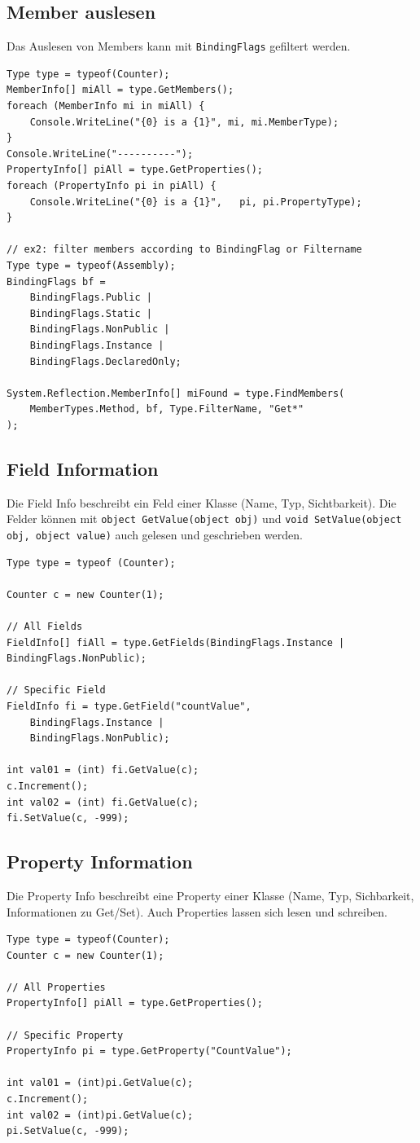 \subsection{Member auslesen}
Das Auslesen von Members kann mit \lstinline|BindingFlags| gefiltert werden.
\begin{lstlisting}[caption=Reflection: Members auslesen]
Type type = typeof(Counter);
MemberInfo[] miAll = type.GetMembers();
foreach (MemberInfo mi in miAll) {
	Console.WriteLine("{0} is a {1}", mi, mi.MemberType);
}
Console.WriteLine("----------");
PropertyInfo[] piAll = type.GetProperties();
foreach (PropertyInfo pi in piAll) {
	Console.WriteLine("{0} is a {1}",	pi, pi.PropertyType);
}

// ex2: filter members according to BindingFlag or Filtername
Type type = typeof(Assembly);
BindingFlags bf =
	BindingFlags.Public |
	BindingFlags.Static |
	BindingFlags.NonPublic |
	BindingFlags.Instance |
	BindingFlags.DeclaredOnly;

System.Reflection.MemberInfo[] miFound = type.FindMembers(
	MemberTypes.Method, bf, Type.FilterName, "Get*"
);
\end{lstlisting}

\subsection{Field Information}
Die Field Info beschreibt ein Feld einer Klasse (Name, Typ, Sichtbarkeit). Die Felder können mit \lstinline|object GetValue(object obj)| und \lstinline|void SetValue(object obj, object value)| auch gelesen und geschrieben werden.

\begin{lstlisting}[caption=Reflection: Field Info]
Type type = typeof (Counter);

Counter c = new Counter(1);

// All Fields
FieldInfo[] fiAll = type.GetFields(BindingFlags.Instance | BindingFlags.NonPublic);
	
// Specific Field
FieldInfo fi = type.GetField("countValue", 
	BindingFlags.Instance | 
	BindingFlags.NonPublic);
	
int val01 = (int) fi.GetValue(c);
c.Increment();
int val02 = (int) fi.GetValue(c);
fi.SetValue(c, -999);
\end{lstlisting}

\subsection{Property Information}
Die Property Info beschreibt eine Property einer Klasse (Name, Typ, Sichbarkeit, Informationen zu Get/Set). Auch Properties lassen sich lesen und schreiben.
\begin{lstlisting}[caption=Reflection: Property Info]
Type type = typeof(Counter);
Counter c = new Counter(1);

// All Properties
PropertyInfo[] piAll = type.GetProperties();

// Specific Property
PropertyInfo pi = type.GetProperty("CountValue");

int val01 = (int)pi.GetValue(c);
c.Increment();
int val02 = (int)pi.GetValue(c);
pi.SetValue(c, -999);
\end{lstlisting}

